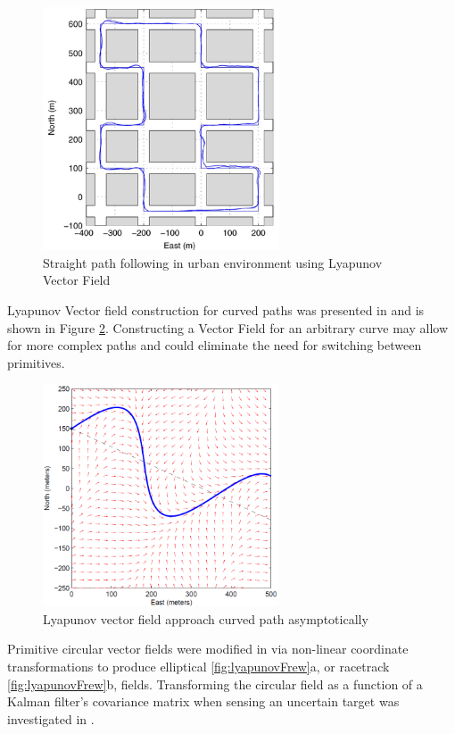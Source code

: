 \documentclass[numbered,pdftex]{ohio-etd}
\begin{document}
\begin{figure}[H]
	\centering
	\includegraphics[width=7cm]{PaperFigures/urbanFollowingNelson}
	\caption{Straight path following in urban environment \cite{nelson_cooperative_2005} using Lyapunov Vector Field}
	\label{fig:urbanfollowingnelson}
\end{figure}

Lyapunov Vector field construction for curved paths was presented in \cite{griffiths_vector_2006} and is shown in Figure \ref{fig:griffiths}. Constructing a Vector Field for an arbitrary curve may allow for more complex paths and could eliminate the need for switching between primitives. 

\begin{figure}[H]
	\centering
	\includegraphics[width=7cm]{PaperFigures/griffiths}
	\caption{Lyapunov vector field approach curved path asymptotically \cite{griffiths_vector_2006}}
	\label{fig:griffiths}
\end{figure}


Primitive circular vector fields were modified in \cite{frew_lyapunov_nodate,frew_cooperative_2007} via non-linear coordinate transformations to produce elliptical \ref{fig:lyapunovFrew}a, or racetrack \ref{fig:lyapunovFrew}b, fields. Transforming the circular field as a function of a Kalman filter's covariance matrix when sensing an uncertain target was investigated in \cite{frew_cooperative_2007}. 
\end{document}
